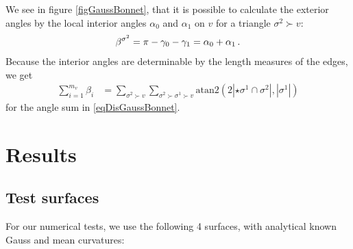     We see in figure \ref{figGaussBonnet}, that it is possible to calculate the exterior angles by the local interior angles 
    \( \alpha_{0} \) and \( \alpha_{1} \) on \( v \) for a
    triangle \( \sigma^{2}\succ v \):
    \begin{align}
      \beta^{\sigma^{2}} = \pi - \gamma_{0} - \gamma_{1} = \alpha_{0} + \alpha_{1} \,\text{.}
    \end{align}
    Because the interior angles are determinable by the length measures of the edges, we get 
    \begin{align}
      \sum_{i=1}^{m_{v}}\beta_{i} &= \sum_{\sigma^{2}\succ v} \sum_{\sigma^{2}\succ\sigma^{1}\succ v}
                               \text{atan2}\left( 2\left|\star\sigma^{1} \cap \sigma^{2} \right|, 
                                 \left|\sigma^{1}\right|\right)
    \end{align}
    for the angle sum in \eqref{eqDisGaussBonnet}.



\section{Results} \label{secResults}
  

  \subsection{Test surfaces}
    For our numerical tests, we use the following 4 surfaces, with analytical known Gauss and mean curvatures:
  
